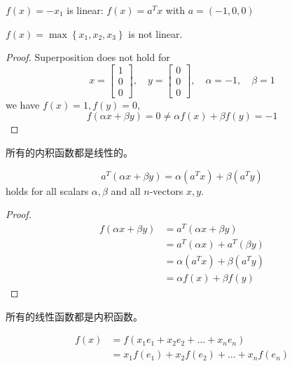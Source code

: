 \begin{example}
    $ f(x)=-x_{1} $ is linear: $ f(x)=a^{T} x $ with $ a=(-1,0,0) $
\end{example}

\begin{example}
    $ f(x)=\max \left\{x_{1}, x_{2}, x_{3}\right\} $ is not linear.
\end{example}

\begin{proof}
    Superposition does not hold for
\begin{equation}
x=\left[\begin{array}{l}
1 \\
0 \\
0
\end{array}\right], \quad y=\left[\begin{array}{l}
0 \\
0 \\
0
\end{array}\right], \quad \alpha=-1, \quad \beta=1
\end{equation}
we have $ f(x)=1, f(y)=0 $,
\begin{equation}
f(\alpha x+\beta y)=0 \neq \alpha f(x)+\beta f(y)=-1
\end{equation}
\end{proof}

\begin{theorem}
    所有的内积函数都是线性的。

    \begin{equation}
a^{T}(\alpha x+\beta y)=\alpha\left(a^{T} x\right)+\beta\left(a^{T} y\right)
\end{equation}
holds for all scalars $ \alpha, \beta $ and all $ n $-vectors $ x, y $.
\end{theorem}

\begin{proof}
    \begin{equation} \begin{aligned} f(\alpha x+\beta y) &=a^{T}(\alpha x+\beta y) \\ &=a^{T}(\alpha x)+a^{T}(\beta y) \\ &=\alpha\left(a^{T} x\right)+\beta\left(a^{T} y\right) \\ &=\alpha f(x)+\beta f(y) \end{aligned} \end{equation}
\end{proof}


\begin{theorem}
    所有的线性函数都是内积函数。

    \begin{equation} \begin{aligned} f(x) &=f\left(x_{1} e_{1}+x_{2} e_{2}+\ldots+x_{n} e_{n}\right) \\ &=x_{1} f\left(e_{1}\right)+x_{2} f\left(e_{2}\right)+\ldots+x_{n} f\left(e_{n}\right) \end{aligned} \end{equation}
\end{theorem}


